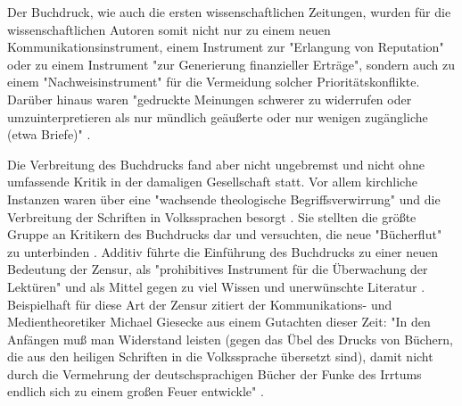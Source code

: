 Der Buchdruck, wie auch die ersten wissenschaftlichen Zeitungen, wurden für die wissenschaftlichen Autoren somit nicht nur zu einem neuen Kommunikationsinstrument, einem Instrument zur "Erlangung von Reputation" oder zu einem Instrument "zur Generierung finanzieller Erträge", sondern auch zu einem "Nachweisinstrument" \cite[:8]{Schirmbacher_2009} für die Vermeidung solcher Prioritätskonflikte. Darüber hinaus waren "gedruckte Meinungen schwerer zu widerrufen oder umzuinterpretieren als nur mündlich geäußerte oder nur wenigen zugängliche (etwa Briefe)" \cite[:603]{Luhmann_1997}.

Die Verbreitung des Buchdrucks fand aber nicht ungebremst und nicht ohne umfassende Kritik in der damaligen Gesellschaft statt. Vor allem kirchliche Instanzen waren über eine "wachsende theologische Begriffsverwirrung" und die Verbreitung der Schriften in Volkssprachen besorgt \cite[:175]{Giesecke_1991}. Sie stellten die größte Gruppe an Kritikern des Buchdrucks dar und versuchten, die neue "Bücherflut" zu unterbinden \cite[:175]{Giesecke_1991}. Additiv führte die Einführung des Buchdrucks zu einer neuen Bedeutung der Zensur, als "prohibitives Instrument für die Überwachung der Lektüren" \cite[:16]{Wunderlich_2008} und als Mittel gegen zu viel Wissen und unerwünschte Literatur \cite[:178]{Giesecke_1991}. Beispielhaft für diese Art der Zensur zitiert der Kommunikations- und Medientheoretiker Michael Giesecke aus einem Gutachten dieser Zeit: "In den Anfängen muß man Widerstand leisten (gegen das Übel des Drucks von Büchern, die aus den heiligen Schriften in die Volkssprache übersetzt sind), damit nicht durch die Vermehrung der deutschsprachigen Bücher der Funke des Irrtums endlich sich zu einem großen Feuer entwickle" \cite[:180]{Giesecke_1991}.


